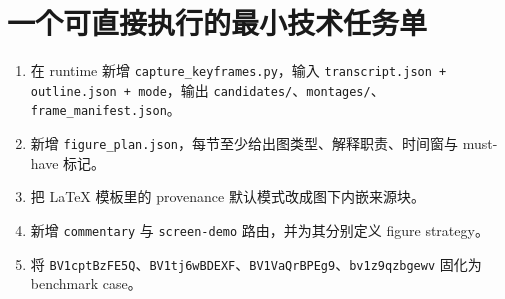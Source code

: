 \documentclass[a4paper]{article}
\begin{document}
\section{一个可直接执行的最小技术任务单}

\begin{enumerate}
\item 在 runtime 新增 \texttt{capture\_keyframes.py}，输入 \texttt{transcript.json + outline.json + mode}，输出 \texttt{candidates/}、\texttt{montages/}、\texttt{frame\_manifest.json}。
\item 新增 \texttt{figure\_plan.json}，每节至少给出图类型、解释职责、时间窗与 must-have 标记。
\item 把 LaTeX 模板里的 provenance 默认模式改成图下内嵌来源块。
\item 新增 \texttt{commentary} 与 \texttt{screen-demo} 路由，并为其分别定义 figure strategy。
\item 将 \texttt{BV1cptBzFE5Q}、\texttt{BV1tj6wBDEXF}、\texttt{BV1VaQrBPEg9}、\texttt{bv1z9qzbgewv} 固化为 benchmark case。
\end{enumerate}
\end{document}
